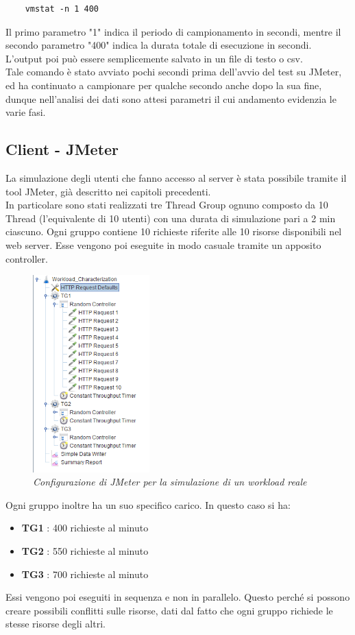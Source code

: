 \begin{verbatim}
	vmstat -n 1 400
\end{verbatim}
Il primo parametro "1" indica il periodo di campionamento in secondi, mentre il secondo parametro "400" indica la durata totale di esecuzione in secondi. L'output poi può essere semplicemente salvato in un file di testo o csv.
\\
Tale comando è stato avviato pochi secondi prima dell'avvio del test su JMeter, ed ha continuato a campionare per qualche secondo anche dopo la sua fine, dunque nell'analisi dei dati sono attesi parametri il cui andamento evidenzia le varie fasi.


\subsection{Client - JMeter}
La simulazione degli utenti che fanno accesso al server è stata possibile tramite il tool JMeter, già descritto nei capitoli precedenti. 
\\In particolare sono stati realizzati tre Thread Group ognuno composto da 10 Thread (l'equivalente di 10 utenti) con una durata di simulazione pari a 2 min ciascuno. Ogni gruppo contiene 10 richieste riferite alle 10 risorse disponibili nel web server. Esse vengono poi eseguite in modo casuale tramite un apposito controller. 
\begin{figure}[H]
	\centering
	\includegraphics[width=0.4\textwidth]{img/hw3/jmeter_reale.png}
	\caption{\textit{Configurazione di JMeter per la simulazione di un workload reale}}
\end{figure}
Ogni gruppo inoltre ha un suo specifico carico. In questo caso si ha:
\begin{itemize}
	\item \textbf{TG1} : 400 richieste al minuto
	\item \textbf{TG2} : 550 richieste al minuto
	\item \textbf{TG3} : 700 richieste al minuto
\end{itemize}
Essi vengono poi eseguiti in sequenza e non in parallelo. Questo perché si possono creare possibili conflitti sulle risorse, dati dal fatto che ogni gruppo richiede le stesse risorse degli altri. 
